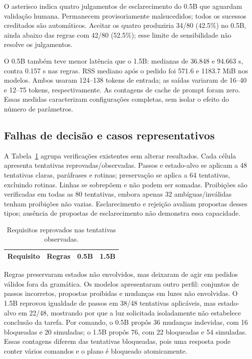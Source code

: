 \documentclass[letterpaper,conference]{IEEEtran}
\providecommand{\StudyPrefix}{}
\begin{document}
O asterisco indica quatro julgamentos de esclarecimento do 0.5B que aguardam validação humana. Permanecem provisoriamente malsucedidos; todos os sucessos creditados são automáticos. Aceitar os quatro produziria 34/80 (42.5\%) no 0.5B, ainda abaixo das regras com 42/80 (52.5\%); esse limite de sensibilidade não resolve os julgamentos.

O 0.5B também teve menor latência que o 1.5B: medianas de 36.848 e 94.663 s, contra 0.157 s nas regras. RSS mediano após o pedido foi 571.6 e 1183.7 MiB nos modelos. Ambos usaram 124--138 tokens de entrada; as saídas variaram de 16--40 e 12--75 tokens, respectivamente. As contagens de cache de prompt foram zero. Essas medidas caracterizam configurações completas, sem isolar o efeito do número de parâmetros.

\subsection{Falhas de decisão e casos representativos}
A Tabela~\ref{tab:failures} agrupa verificações existentes sem alterar resultados. Cada célula apresenta tentativas reprovadas/observadas. Passos e estado-alvo se aplicam a 48 tentativas claras, paráfrases e rotinas; preservação se aplica a 64 tentativas, excluindo rotinas. Linhas se sobrepõem e não podem ser somadas. Proibições são verificadas em todas as 80 tentativas, embora apenas 32 ambíguas/inválidas tenham proibições não vazias. Esclarecimento e rejeição avaliam propostas desses tipos; ausência de propostas de esclarecimento não demonstra essa capacidade.
\begin{table}[t]\caption{Requisitos reprovados nas tentativas observadas.}
\centering\footnotesize\begin{tabular}{lrrr}\toprule
Requisito & Regras & 0.5B & 1.5B\\\midrule

\end{tabular}\label{tab:failures}\end{table}

Regras preservaram estados não envolvidos, mas deixaram de agir em pedidos válidos fora da gramática. Os modelos apresentaram outro perfil: conjuntos de passos incorretos, propostas proibidas e mudanças em luzes não envolvidas. O 1.5B reprovou igualdade de passos em 38/48 tentativas aplicáveis, mas estado-alvo em 22/48, mostrando por que a luz solicitada isoladamente não estabelece conclusão da tarefa. Por comando, o 0.5B propôs 36 mudanças indevidas, com 16 bloqueadas e 20 simuladas; o 1.5B propôs 76, com 22 bloqueadas e 54 simuladas. Essas contagens diferem das tentativas bloqueadas, pois uma resposta pode conter vários comandos e o plano é bloqueado atomicamente.
\end{document}
